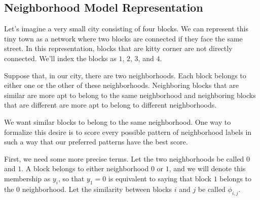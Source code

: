 \subsection{Neighborhood Model Representation}
Let's imagine a very small city consisting of four blocks. We can
represent this tiny town as a network where two blocks are connected
if they face the same street. In this representation, blocks that are
kitty corner are not directly connected. We'll index the blocks as
$1$, $2$, $3$, and $4$.

\begin{figure}[h]
\centering
{}
\end{figure}

\begin{figure}[h]
\centering


\end{figure}

Suppose that, in our city, there are two neighborhoods. Each block
belongs to either one or the other of these neighborhoods. Neighboring
blocks that are similar are more apt to belong to the same
neighborhood and neighboring blocks that are different are more apt to
belong to different neighborhoods.

We want similar blocks to belong to the same
neighborhood. One way to formalize this desire is to score every
possible pattern of neighborhood labels in such a way that our
preferred patterns have the best score.

First, we need some more precise terms. Let the two neighborhoods be
called $0$ and $1$. A block belongs to either neighborhood $0$ or
$1$, and we will denote this membership as $y_i$, so that $y_1=0$ is
equivalent to saying that block $1$ belongs to the $0$
neighborhood. Let the similarity between blocks $i$ and $j$ be called
$\phi_{i,j}$.

\begin{figure}[!h]
\centering


\end{figure}


